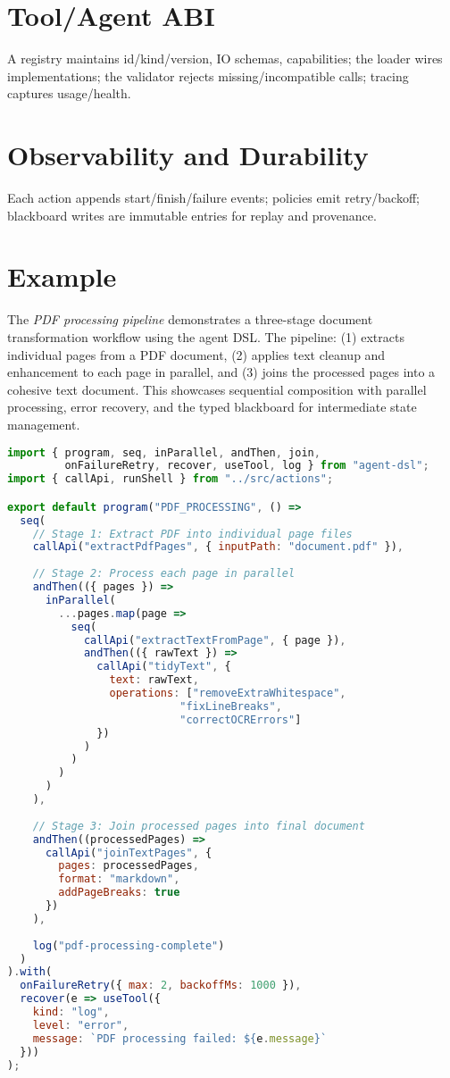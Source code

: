 \documentclass[11pt,a4paper]{article}
\begin{document}
\section{Tool/Agent ABI}
A registry maintains id/kind/version, IO schemas, capabilities; the loader wires implementations; the validator rejects missing/incompatible calls; tracing captures usage/health.
\section{Observability and Durability}
Each action appends start/finish/failure events; policies emit retry/backoff; blackboard writes are immutable entries for replay and provenance.
\section{Example}
The \emph{PDF processing pipeline} demonstrates a three-stage document transformation workflow using the agent DSL. The pipeline: (1) extracts individual pages from a PDF document, (2) applies text cleanup and enhancement to each page in parallel, and (3) joins the processed pages into a cohesive text document. This showcases sequential composition with parallel processing, error recovery, and the typed blackboard for intermediate state management.

\begin{lstlisting}[language=JavaScript, basicstyle=\ttfamily\small, frame=single]
import { program, seq, inParallel, andThen, join, 
         onFailureRetry, recover, useTool, log } from "agent-dsl";
import { callApi, runShell } from "../src/actions";

export default program("PDF_PROCESSING", () =>
  seq(
    // Stage 1: Extract PDF into individual page files
    callApi("extractPdfPages", { inputPath: "document.pdf" }),
    
    // Stage 2: Process each page in parallel
    andThen(({ pages }) => 
      inParallel(
        ...pages.map(page => 
          seq(
            callApi("extractTextFromPage", { page }),
            andThen(({ rawText }) => 
              callApi("tidyText", { 
                text: rawText,
                operations: ["removeExtraWhitespace", 
                           "fixLineBreaks", 
                           "correctOCRErrors"]
              })
            )
          )
        )
      )
    ),
    
    // Stage 3: Join processed pages into final document
    andThen((processedPages) => 
      callApi("joinTextPages", { 
        pages: processedPages,
        format: "markdown",
        addPageBreaks: true
      })
    ),
    
    log("pdf-processing-complete")
  )
).with(
  onFailureRetry({ max: 2, backoffMs: 1000 }),
  recover(e => useTool({ 
    kind: "log", 
    level: "error", 
    message: `PDF processing failed: ${e.message}` 
  }))
);
\end{lstlisting}
\end{document}
